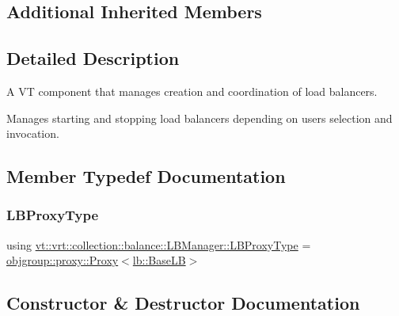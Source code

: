 \subsection*{Additional Inherited Members}


\subsection{Detailed Description}
A VT component that manages creation and coordination of load balancers. 

Manages starting and stopping load balancers depending on user\textquotesingle{}s selection and invocation. 

\subsection{Member Typedef Documentation}
\mbox{\label{structvt_1_1vrt_1_1collection_1_1balance_1_1_l_b_manager_a8b1a7735366beb85c2c2ccc3912cdd80}} 
\subsubsection{\texorpdfstring{L\+B\+Proxy\+Type}{LBProxyType}}
{\footnotesize\ttfamily using \hyperlink{structvt_1_1vrt_1_1collection_1_1balance_1_1_l_b_manager_a8b1a7735366beb85c2c2ccc3912cdd80}{vt\+::vrt\+::collection\+::balance\+::\+L\+B\+Manager\+::\+L\+B\+Proxy\+Type} =  \hyperlink{structvt_1_1objgroup_1_1proxy_1_1_proxy}{objgroup\+::proxy\+::\+Proxy}$<$\hyperlink{structvt_1_1vrt_1_1collection_1_1lb_1_1_base_l_b}{lb\+::\+Base\+LB}$>$}



\subsection{Constructor \& Destructor Documentation}
\mbox{\label{structvt_1_1vrt_1_1collection_1_1balance_1_1_l_b_manager_a4adad6931af7d5ff2cb983859ed939f3}} 
